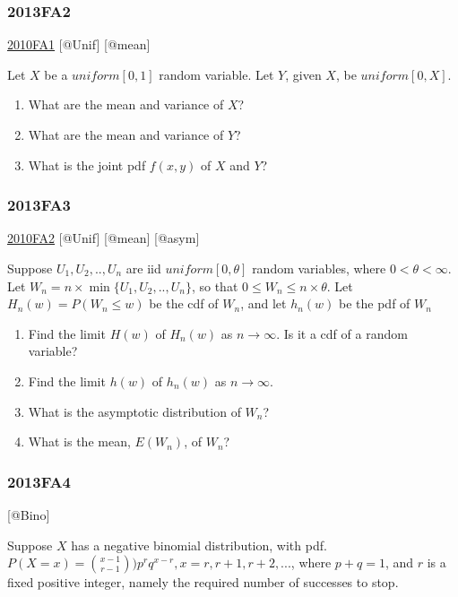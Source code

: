 \documentclass[6pt,twocolumn,Portrait]{article}
\begin{document}
\hypertarget{fa2-2}{%
\subsubsection{2013FA2}\label{fa2-2}}

\protect\hyperlink{fa1-1}{2010FA1} {[}@Unif{]} {[}@mean{]}

Let \(X\) be a \(uniform[0,1]\) random variable. Let \(Y\), given \(X\),
be \(uniform[0,X]\).

\begin{enumerate}
\def\labelenumi{(\alph{enumi})}
\item
  What are the mean and variance of \(X\)?
\item
  What are the mean and variance of \(Y\)?
\item
  What is the joint pdf \(f(x,y)\) of \(X\) and \(Y\)?
\end{enumerate}

\hypertarget{fa3-2}{%
\subsubsection{2013FA3}\label{fa3-2}}

\protect\hyperlink{fa2-1}{2010FA2} {[}@Unif{]} {[}@mean{]} {[}@asym{]}

Suppose \(U_1,U_2,..,U_n\) are iid \(uniform[0,\theta]\) random
variables, where \(0<\theta<\infty\). Let
\(W_n=n\times\min\{U_1,U_2,..,U_n\}\), so that
\(0\le W_n\le n\times\theta\). Let \(H_n(w)=P(W_n\le w)\) be the cdf of
\(W_n\), and let \(h_n(w)\) be the pdf of \(W_n\)

\begin{enumerate}
\def\labelenumi{(\alph{enumi})}
\item
  Find the limit \(H(w)\) of \(H_n(w)\) as \(n\to\infty\). Is it a cdf
  of a random variable?
\item
  Find the limit \(h(w)\) of \(h_n(w)\) as \(n\to\infty\).
\item
  What is the asymptotic distribution of \(W_n\)?
\item
  What is the mean, \(E(W_n)\), of \(W_n\)?
\end{enumerate}

\hypertarget{fa4-2}{%
\subsubsection{2013FA4}\label{fa4-2}}

{[}@Bino{]}

Suppose \(X\) has a negative binomial distribution, with pdf.
\(P(X=x)=\binom{x-1}{r-1})p^rq^{x-r},x=r,r+1,r+2,...\), where
\(p+ q=1\), and \(r\) is a fixed positive integer, namely the required
number of successes to stop.
\end{document}
